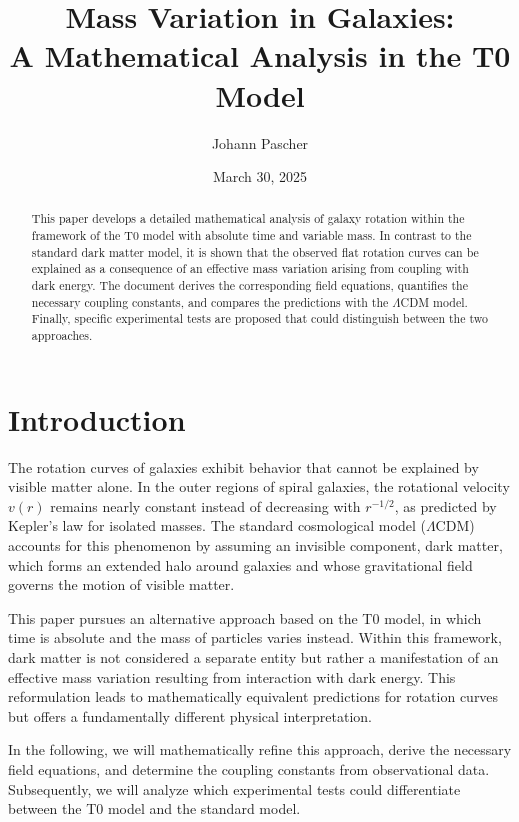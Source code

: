 \documentclass[a4paper,12pt]{article}
\begin{document}
	
	\title{Mass Variation in Galaxies: \\A Mathematical Analysis in the T0 Model}
	\author{Johann Pascher}
	\date{March 30, 2025}
	\maketitle
	
	\begin{abstract}
		This paper develops a detailed mathematical analysis of galaxy rotation within the framework of the T0 model with absolute time and variable mass. In contrast to the standard dark matter model, it is shown that the observed flat rotation curves can be explained as a consequence of an effective mass variation arising from coupling with dark energy. The document derives the corresponding field equations, quantifies the necessary coupling constants, and compares the predictions with the $\Lambda$CDM model. Finally, specific experimental tests are proposed that could distinguish between the two approaches.
	\end{abstract}
	
	\tableofcontents
	\newpage
	
	\section{Introduction}
	
	The rotation curves of galaxies exhibit behavior that cannot be explained by visible matter alone. In the outer regions of spiral galaxies, the rotational velocity $v(r)$ remains nearly constant instead of decreasing with $r^{-1/2}$, as predicted by Kepler’s law for isolated masses. The standard cosmological model ($\Lambda$CDM) accounts for this phenomenon by assuming an invisible component, dark matter, which forms an extended halo around galaxies and whose gravitational field governs the motion of visible matter.
	
	This paper pursues an alternative approach based on the T0 model, in which time is absolute and the mass of particles varies instead. Within this framework, dark matter is not considered a separate entity but rather a manifestation of an effective mass variation resulting from interaction with dark energy. This reformulation leads to mathematically equivalent predictions for rotation curves but offers a fundamentally different physical interpretation.
	
	In the following, we will mathematically refine this approach, derive the necessary field equations, and determine the coupling constants from observational data. Subsequently, we will analyze which experimental tests could differentiate between the T0 model and the standard model.
	
\end{document}
